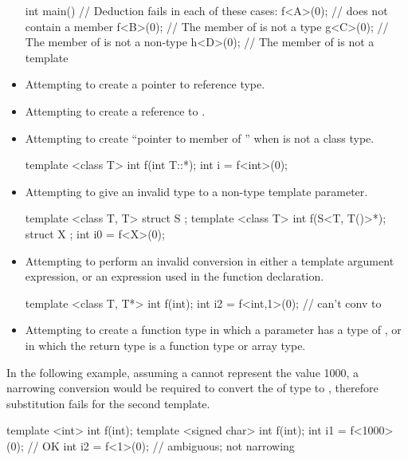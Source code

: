 \begin{note}
\begin{itemize}
\begin{example}
\begin{codeblock}
int main() {
  // Deduction fails in each of these cases:
  f<A>(0);          //  does not contain a member 
  f<B>(0);          // The  member of  is not a type
  g<C>(0);          // The  member of  is not a non-type
  h<D>(0);          // The  member of  is not a template
}
\end{codeblock}
\end{example}
\item
Attempting to create a pointer to reference type.
\item
Attempting to create a reference to .
\item
Attempting to create ``pointer to member of '' when  is not a
class type.
\begin{example}
\begin{codeblock}
template <class T> int f(int T::*);
int i = f<int>(0);
\end{codeblock}
\end{example}
\item
Attempting to give an invalid type to a non-type template parameter.
\begin{example}
\begin{codeblock}
template <class T, T> struct S {};
template <class T> int f(S<T, T()>*);
struct X {};
int i0 = f<X>(0);
\end{codeblock}
\end{example}

\item
Attempting to perform an invalid conversion in either a template
argument expression, or an expression used in the function
declaration.
\begin{example}
\begin{codeblock}
template <class T, T*> int f(int);
int i2 = f<int,1>(0);           // can't conv  to 
\end{codeblock}
\end{example}

\item
Attempting to create a function type in which a parameter has a type
of , or in which the return type is a function type
or array type.
\end{itemize}
\end{note}

\pnum
\begin{example}
In the following example,
assuming a 
cannot represent the value 1000,
a narrowing conversion
would be required
to convert the 
of type  to ,
therefore substitution fails for the
second template.

\begin{codeblock}
template <int> int f(int);
template <signed char> int f(int);
int i1 = f<1000>(0);            // OK
int i2 = f<1>(0);               // ambiguous; not narrowing
\end{codeblock}
\end{example}

